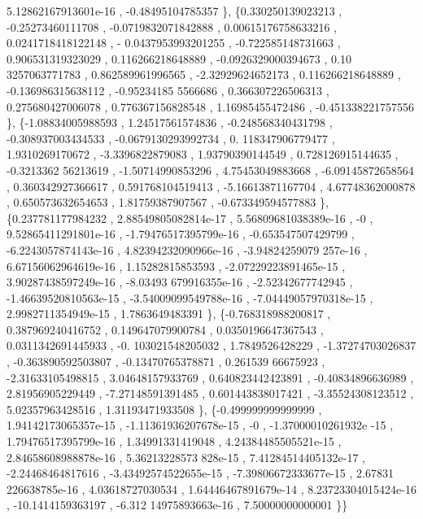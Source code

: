 \begin{DoxyCode}
      5.12862167913601e-16 , -0.48495104785357 \},
\{0.330250139023213 , -0.25273460111708 , -0.0719832071842888 , 0.00615176758633216 , 0.0241718418122148 , -
      0.0437953993201255 , -0.722585148731663 , 0.906531319323029 , 0.116266218648889 , -0.0926329000394673 , 0.10
      3257063771783 , 0.862589961996565 , -2.32929624652173 , 0.116266218648889 , -0.136986315638112 , -0.95234185
      5566686 , 0.366307226506313 , 0.275680427006078 , 0.776367156828548 ,  1.16985455472486 , -0.451338221757556
       \},
\{-1.08834005988593 ,  1.24517561574836 , -0.248568340431798 , -0.308937003434533 , -0.0679130293992734 , 0.
      118347906779477 ,   1.9310269170672 ,  -3.3396822879083 ,  1.93790390144549 , 0.728126915144635 , -0.3213362
      56213619 , -1.50714990853296 ,  4.75453049883668 , -6.09145872658564 , 0.360342927366617 , 0.591768104519413
       , -5.16613871167704 ,  4.67748362000878 , 0.650573632654653 ,  1.81759387907567 , -0.673349594577883 \},
\{0.237781177984232 , 2.88549805082814e-17 , 5.56809681038389e-16 ,                -0 , 9.52865411291801e-16
       , -1.79476517395799e-16 , -0.653547507429799 , -6.2243057874143e-16 , 4.82394232090966e-16 , -3.94824259079
      257e-16 , 6.67156062964619e-16 ,  1.15282815853593 , -2.07229223891465e-15 , 3.90287438597249e-16 , -8.03493
      679916355e-16 , -2.52342677742945 , -1.46639520810563e-15 , -3.54009099549788e-16 , -7.04449057970318e-15 , 
      2.9982711354949e-15 ,   1.7863649483391 \},
\{-0.768318988200817 , 0.387969240416752 , 0.149647079900784 , 0.0350196647367543 , 0.0311342691445933 , -0.
      103021548205032 ,   1.7849526428229 , -1.37274703026837 , -0.363890592503807 , -0.13470765378871 ,  0.261539
      66675923 , -2.31633105498815 ,  3.04648157933769 , 0.640823442423891 , -0.40834896636989 ,  2.81956905229449
       , -7.27148591391485 , 0.601443838017421 , -3.35524308123512 ,  5.02357963428516 ,  1.31193471933508 \},
\{-0.499999999999999 , 1.94142173065357e-15 , -1.11361936207678e-15 ,                -0 , -1.37000010261932e
      -15 , 1.79476517395799e-16 ,  1.34991331419048 , 4.24384485505521e-15 , 2.84658608988878e-16 , 5.36213228573
      828e-15 , 7.41284514405132e-17 , -2.24468464817616 , -3.43492574522655e-15 , -7.39806672333677e-15 , 2.67831
      226638785e-16 ,  4.03618727030534 , 1.64446467891679e-14 , 8.23723304015424e-16 , -10.1414159363197 , -6.312
      14975893663e-16 ,  7.50000000000001 \}\}
\end{DoxyCode}
\mbox{\label{a00518_a7556b1136ab46bbbbfda80a1ffcff11f}} 

